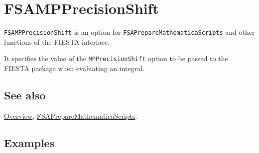 \documentclass[../FeynHelpersManual.tex]{subfiles}
\begin{document}
\hypertarget{fsampprecisionshift}{
\section{FSAMPPrecisionShift}\label{fsampprecisionshift}}

\texttt{FSAMPPrecisionShift} is an option for
\texttt{FSAPrepareMathematicaScripts} and other functions of the FIESTA
interface.

It specifies the value of the \texttt{MPPrecisionShift} option to be
passed to the FIESTA package when evaluating an integral.

\subsection{See also}

\hyperlink{toc}{Overview},
\hyperlink{fsapreparemathematicascripts}{FSAPrepareMathematicaScripts}.

\subsection{Examples}
\end{document}
